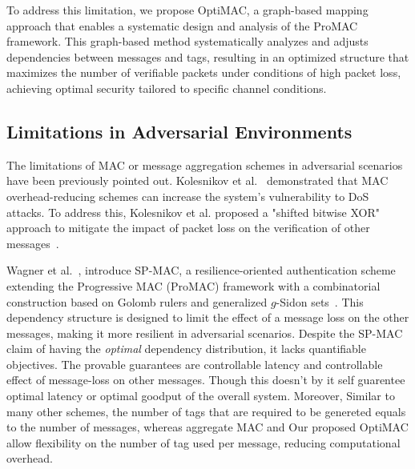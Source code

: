 To address this limitation, we propose OptiMAC, a graph-based mapping approach that enables a systematic design and analysis of the ProMAC framework. This graph-based method systematically analyzes and adjusts dependencies between messages and tags, resulting in an optimized structure that maximizes the number of verifiable packets under conditions of high packet loss, achieving optimal security tailored to specific channel conditions.



\subsection{Limitations in Adversarial Environments}
The limitations of MAC or message aggregation schemes in adversarial scenarios have been previously pointed out. Kolesnikov et al.~\cite{DoS_AggregateMAC} demonstrated that MAC overhead-reducing schemes can increase the system's vulnerability to DoS attacks. To address this, Kolesnikov et al. proposed a "shifted bitwise XOR" approach to mitigate the impact of packet loss on the verification of other messages~\cite{DoS_AggregateMAC}.

Wagner et al.~\cite{proMac2}, introduce SP-MAC, a resilience-oriented authentication scheme extending the Progressive MAC (ProMAC) framework with a combinatorial construction based on Golomb rulers and generalized $g$-Sidon sets~\cite{proMac2}. This dependency structure is designed to limit the effect of a message loss on the other messages, making it more resilient in adversarial scenarios. Despite the SP-MAC claim of having the \emph{optimal} dependency distribution, it lacks quantifiable objectives. The provable guarantees are controllable latency and controllable effect of message-loss on other messages. Though this doesn't by it self guarentee optimal latency or optimal goodput of the overall system. Moreover, Similar to many other schemes, the number of tags that are required to be genereted equals to the number of messages, whereas aggregate MAC and Our proposed OptiMAC allow flexibility on the number of tag used per message, reducing computational overhead. 

